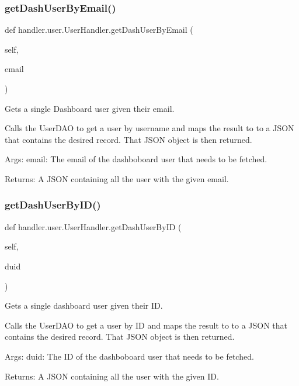 \subsubsection{\texorpdfstring{get\+Dash\+User\+By\+Email()}{getDashUserByEmail()}}
{\footnotesize\ttfamily def handler.\+user.\+User\+Handler.\+get\+Dash\+User\+By\+Email (\begin{DoxyParamCaption}\item[{}]{self,  }\item[{}]{email }\end{DoxyParamCaption})}

\begin{DoxyVerb}Gets a single Dashboard user given their email.

Calls the UserDAO to get a user by username and maps the result to
to a JSON that contains the desired record. That JSON object 
is then returned.

Args:
    email: The email of the dashboboard user that needs to be fetched.

Returns:
    A JSON containing all the user with the given email.
\end{DoxyVerb}
 \mbox{\label{classhandler_1_1user_1_1_user_handler_a8496fb014da7425079e6a2c02a5b6af6}} 
\subsubsection{\texorpdfstring{get\+Dash\+User\+By\+I\+D()}{getDashUserByID()}}
{\footnotesize\ttfamily def handler.\+user.\+User\+Handler.\+get\+Dash\+User\+By\+ID (\begin{DoxyParamCaption}\item[{}]{self,  }\item[{}]{duid }\end{DoxyParamCaption})}

\begin{DoxyVerb}Gets a single dashboard user given their ID.

Calls the UserDAO to get a user by ID and maps the result to
to a JSON that contains the desired record. That JSON object 
is then returned.

Args:
    duid: The ID of the dashboboard user that needs to be fetched.

Returns:
    A JSON containing all the user with the given ID.
\end{DoxyVerb}
 \mbox{\label{classhandler_1_1user_1_1_user_handler_a70ef6b477b3320b72ffdd736df0f0f96}} 
